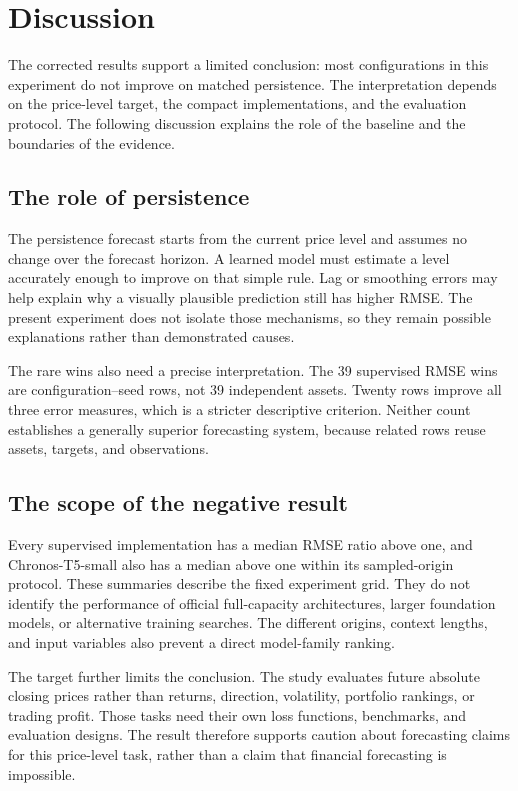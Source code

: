 \section{Discussion}

The corrected results support a limited conclusion: most configurations in this experiment do not improve on matched persistence. The interpretation depends on the price-level target, the compact implementations, and the evaluation protocol. The following discussion explains the role of the baseline and the boundaries of the evidence.

\subsection{The role of persistence}

The persistence forecast starts from the current price level and assumes no change over the forecast horizon. A learned model must estimate a level accurately enough to improve on that simple rule. Lag or smoothing errors may help explain why a visually plausible prediction still has higher RMSE. The present experiment does not isolate those mechanisms, so they remain possible explanations rather than demonstrated causes.

The rare wins also need a precise interpretation. The 39 supervised RMSE wins are configuration--seed rows, not 39 independent assets. Twenty rows improve all three error measures, which is a stricter descriptive criterion. Neither count establishes a generally superior forecasting system, because related rows reuse assets, targets, and observations.

\subsection{The scope of the negative result}

Every supervised implementation has a median RMSE ratio above one, and Chronos-T5-small also has a median above one within its sampled-origin protocol. These summaries describe the fixed experiment grid. They do not identify the performance of official full-capacity architectures, larger foundation models, or alternative training searches. The different origins, context lengths, and input variables also prevent a direct model-family ranking.

The target further limits the conclusion. The study evaluates future absolute closing prices rather than returns, direction, volatility, portfolio rankings, or trading profit. Those tasks need their own loss functions, benchmarks, and evaluation designs. The result therefore supports caution about forecasting claims for this price-level task, rather than a claim that financial forecasting is impossible.

